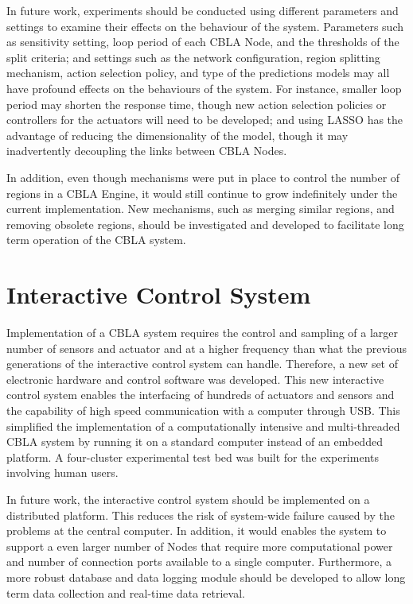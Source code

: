 In future work, experiments should be conducted using different parameters and settings to examine their effects on the behaviour of the system. Parameters such as sensitivity setting, loop period of each CBLA Node, and the thresholds of the split criteria; and settings such as the network configuration, region splitting mechanism, action selection policy, and type of the predictions models may all have profound effects on the behaviours of the system. For instance, smaller loop period may shorten the response time, though new action selection policies or controllers for the actuators will need to be developed; and using LASSO has the advantage of reducing the dimensionality of the model, though it may inadvertently decoupling the links between CBLA Nodes. 

In addition, even though mechanisms were put in place to control the number of regions in a CBLA Engine, it would still continue to grow indefinitely under the current implementation. New mechanisms, such as merging similar regions, and removing obsolete regions, should be investigated and developed to facilitate long term operation of the CBLA system.


\section{Interactive Control System}
Implementation of a CBLA system requires the control and sampling of a larger number of sensors and actuator and at a higher frequency than what the previous generations of the interactive control system can handle. Therefore, a new set of electronic hardware and control software was developed. This new interactive control system enables the interfacing of hundreds of actuators and sensors and the capability of high speed communication with a computer through USB. This simplified the implementation of a computationally intensive and multi-threaded CBLA system by running it on a standard computer instead of an embedded platform. A four-cluster experimental test bed was built for the experiments involving human users.

In future work, the interactive control system should be implemented on a distributed platform. This reduces the risk of system-wide failure caused by the problems at the central computer. In addition, it would enables the system to support a even larger number of Nodes that require more computational power and number of connection ports available to a single computer. Furthermore, a more robust database and data logging module should be developed to allow long term data collection and real-time data retrieval. 


